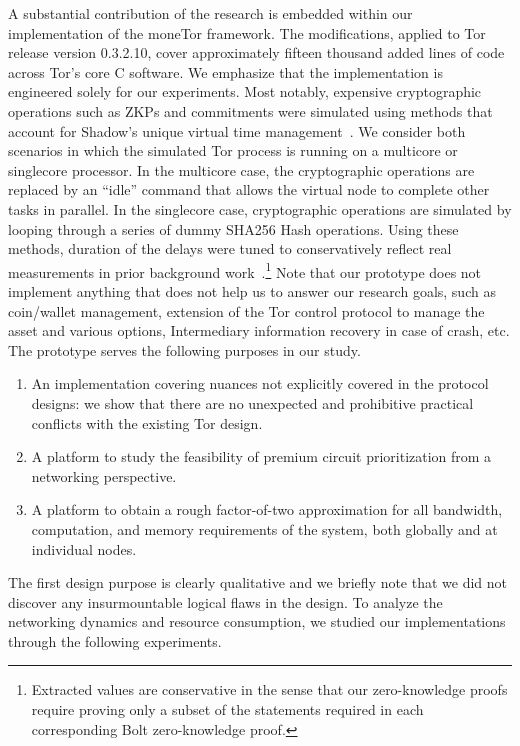 A substantial contribution of the research is embedded within our implementation
of the moneTor framework. The modifications, applied to Tor release version
0.3.2.10, cover approximately fifteen thousand added lines of code across Tor's
core C software. We emphasize that the implementation is engineered solely for
our experiments. Most notably, expensive cryptographic operations such as ZKPs
and commitments were simulated using methods that account for Shadow's unique
virtual time management~\cite{jansen2011shadow}. We consider both scenarios in
which the simulated Tor process is running on a multicore or singlecore
processor. In the multicore case, the cryptographic operations are replaced by
an ``idle'' command that allows the virtual node to complete other tasks in
parallel. In the singlecore case, cryptographic operations are simulated by
looping through a series of dummy SHA256 Hash operations.
Using these methods, duration of the delays were tuned to conservatively reflect
real measurements in prior background
work~\cite{green2017bolt}.\footnote{Extracted values are conservative in the
  sense that our zero-knowledge proofs require proving only a subset of the
  statements required in each corresponding Bolt zero-knowledge proof.} Note
that our prototype does not implement anything that does not help us to answer
our research goals, such as coin/wallet management, extension of the Tor control
protocol to manage the asset and various options, Intermediary information
recovery in case of crash, etc. The prototype serves the following purposes in
our study.
\begin{enumerate}
\item An implementation covering nuances not explicitly covered in the protocol
  designs: we show that there are no unexpected and
  prohibitive practical conflicts with the existing Tor design.
\item A platform to study the feasibility of premium circuit prioritization from
  a networking perspective.
\item A platform to obtain a rough factor-of-two approximation for all
  bandwidth, computation, and memory requirements of the system, both globally
  and at individual nodes.
\end{enumerate}

The first design purpose is clearly qualitative and we briefly note that we did
not discover any insurmountable logical flaws in the design. To analyze the
networking dynamics and resource consumption, we studied our implementations
through the following experiments.

